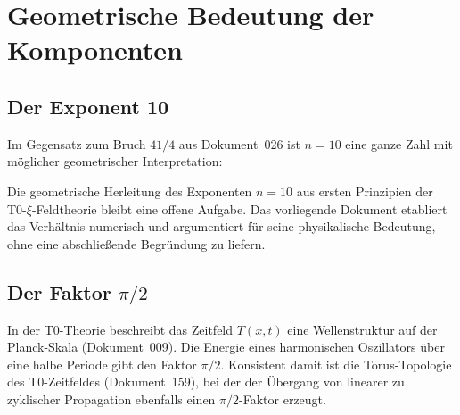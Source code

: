 \section{Geometrische Bedeutung der Komponenten}
\label{sec:geometrie}

\subsection{Der Exponent 10}

Im Gegensatz zum Bruch $41/4$ aus Dokument~026 ist $n = 10$ eine ganze Zahl
mit möglicher geometrischer Interpretation:

\begin{table}[H]
    \centering
    \caption{Mögliche Interpretationen des Exponenten $n=10$.
    Welche davon fundamental ist, bleibt offen und
    wäre in einem separaten Dokument zu untersuchen.}
    \label{tab:exp10}
\end{table}

\begin{important}
    Die geometrische Herleitung des Exponenten $n = 10$ aus
    ersten Prinzipien der T0-$\xi$-Feldtheorie bleibt eine offene Aufgabe.
    Das vorliegende Dokument etabliert das Verhältnis numerisch und
    argumentiert für seine physikalische Bedeutung, ohne eine
    abschließende Begründung zu liefern.
\end{important}

\subsection{Der Faktor \texorpdfstring{$\pi/2$}{pi/2}}

In der T0-Theorie beschreibt das Zeitfeld $T(x,t)$ eine Wellenstruktur
auf der Planck-Skala (Dokument~009). Die Energie eines harmonischen
Oszillators über eine halbe Periode gibt den Faktor $\pi/2$. Konsistent
damit ist die Torus-Topologie des T0-Zeitfeldes (Dokument~159), bei der
der Übergang von linearer zu zyklischer Propagation ebenfalls einen
$\pi/2$-Faktor erzeugt.

